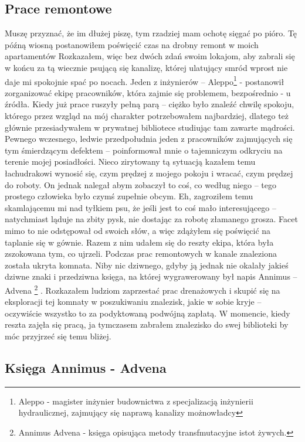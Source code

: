 \documentclass[12pt,a4paper]{report}
\begin{document}
\subsection{Prace remontowe}

Muszę przyznać, że im dłużej piszę, tym rzadziej mam ochotę sięgać po pióro. Tę późną wiosną postanowiłem poświęcić czas na drobny remont w moich apartamentów Rozkazałem, więc bez dwóch zdań swoim lokajom, aby zabrali się w końcu za tą wiecznie psującą się kanalizę, której ulatujący smród wprost nie daje mi spokojnie spać po nocach. Jeden z inżynierów – Aleppo\footnote{Aleppo - magister inżynier budownictwa z specjalizacją  inżynierii hydraulicznej, zajmujący się naprawą kanalizy możnowładcy}  - postanowił zorganizować ekipę pracowników, która zajmie się problemem, bezpośrednio - u źródła. Kiedy już prace ruszyły pełną parą – ciężko było znaleźć chwilę spokoju, którego przez wzgląd na mój charakter potrzebowałem najbardziej, dlatego też głównie przesiadywałem w prywatnej bibliotece studiując tam zawarte mądrości. Pewnego wczesnego, ledwie przedpołudnia jeden z pracowników zajmujących się tym śmierdzącym defektem – poinformował mnie o tajemniczym odkryciu na terenie mojej posiadłości. Nieco zirytowany tą sytuacją kazałem temu łachudrakowi wynosić się, czym prędzej z mojego pokoju i wracać, czym prędzej do roboty. On jednak nalegał abym zobaczył to coś, co według niego – tego prostego człowieka było czymś zupełnie obcym. Eh, zagroziłem temu skamlającemu mi nad tyłkiem psu, że jeśli jest to coś mało interesującego – natychmiast ląduje na zbity pysk, nie dostając za robotę złamanego grosza. Facet mimo to nie odstępował od swoich słów, a więc zdążyłem się poświęcić na taplanie się w gównie. Razem z nim udałem się do reszty ekipa, która była zszokowana tym, co ujrzeli. Podczas prac remontowych w kanale znaleziona została ukryta komnata. Niby nic dziwnego, gdyby ją jednak nie okalały jakieś dziwne znaki i przedziwna księga, na której wygrawerowany był napis Annimus – Advena \footnote{Annimus Advena - księga opisująca metody transfmutacyjne istot żywych.} . Rozkazałem ludziom zaprzestać prac drenażowych i skupić się na eksploracji tej komnaty w poszukiwaniu znalezisk, jakie w sobie kryje – oczywiście wszystko to za podyktowaną podwójną zapłatą. W momencie, kiedy reszta zajęła się pracą, ja tymczasem zabrałem znalezisko do swej biblioteki by móc przyjrzeć się temu bliżej.
 
\subsection{Księga Annimus - Advena}
\end{document}
